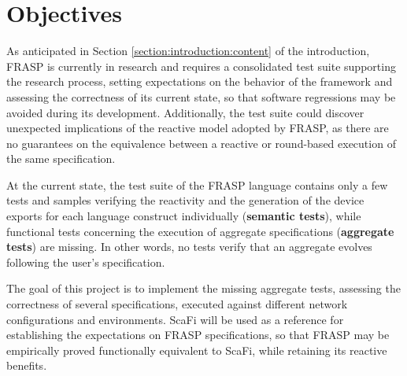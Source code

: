 
\section{Objectives}
\label{section:analysis:objectives}

As anticipated in Section \ref{section:introduction:content} of the
introduction, FRASP is currently in research and requires a consolidated test
suite supporting the research process, setting expectations on the behavior of
the framework and assessing the correctness of its current state, so that
software regressions may be avoided during its development. Additionally, the
test suite could discover unexpected implications of the reactive model adopted
by FRASP, as there are no guarantees on the equivalence between a reactive or
round-based execution of the same specification.

At the current state, the test suite of the FRASP language contains only a few
tests and samples verifying the reactivity and the generation of the device
exports for each language construct individually (\textbf{semantic tests}),
while functional tests concerning the execution of aggregate specifications
(\textbf{aggregate tests}) are missing. In other words, no tests verify that an
aggregate evolves following the user's specification.

The goal of this project is to implement the missing aggregate tests, assessing
the correctness of several specifications, executed against different network
configurations and environments. \ac{ScaFi} will be used as a reference for
establishing the expectations on FRASP specifications, so that FRASP may be
empirically proved functionally equivalent to \ac{ScaFi}, while retaining its
reactive benefits.
